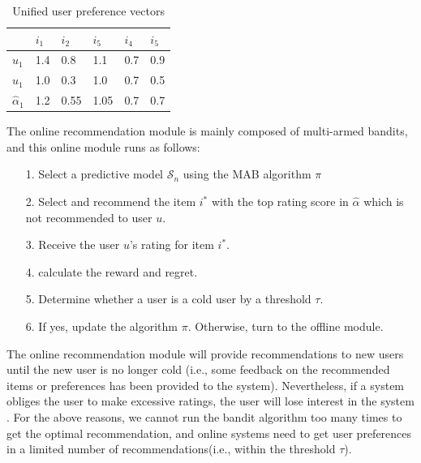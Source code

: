 \begin{table}[htbp]
    \centering
\begin{tabular}{llllll}
\hline
  & $i_{1}$ & $i_{2}$   & $i_{5}$   & $i_{4}$   & $i_{5}$   \\ \hline
$u_{1}$& 1.4      & 0.8   & 1.1 & 0.7 & 0.9   \\
$u_{1}$& 1.0       & 0.3 & 1.0   & 0.7 & 0.5 \\ \hline
$\hat{\alpha}_{1}$& 1.2      & 0.55 & 1.05   & 0.7   & 0.7 \\

\end{tabular}
\caption{Unified user preference vectors}
\end{table}
The online recommendation module is mainly composed of multi-armed bandits, and this online module runs as follows:
\begin{itemize}
    \item[1. ] Select a predictive model $\mathcal{S}_{n}$ using the MAB algorithm $\pi$
    \item[2. ]  Select and recommend the item $i^*$ with the top rating score in $\hat{\alpha}$ which is not recommended to user $u$.
    \item[3. ]  Receive the user $u$'s rating for item $i^*$.
    \item[4. ]  calculate the reward and regret.
    \item[5. ]  Determine whether a user is a cold user by a threshold $\tau $.
    \item[6. ]  If yes, update the algorithm $\pi$. Otherwise, turn to the offline module.
\end{itemize}
The online recommendation module will provide recommendations to new users until the new user is no longer cold (i.e., some feedback on the recommended items or preferences has been provided to the system). Nevertheless, if a system obliges the user to make excessive ratings, the user will lose interest in the system \cite{threshold}. For the above reasons, we cannot run the bandit algorithm too many times to get the optimal recommendation, and online systems need to get user preferences in a limited number of recommendations(i.e., within the threshold $\tau $).


